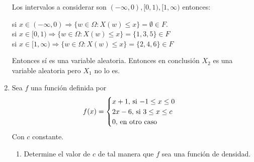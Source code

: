 \documentclass[12pt,a4paper]{report}
\begin{document}
\begin{enumerate}
{			Los intervalos a considerar son $(-\infty,0),[0,1),[1,\infty)$ entonces:\\
			\begin{center}
			    si $x\in (-\infty,0) \Rightarrow \lbrace w\in \Omega: X(w) \leq x \rbrace = \emptyset \in F. $\\
			    si $x\in [0,1) \Rightarrow \lbrace w \in \Omega: X(w) \leq x \rbrace = \lbrace 1,3,5 \rbrace \in F$  \\
			    si $x\in [1,\infty) \Rightarrow \lbrace w\in \Omega: X(w)\leq x \rbrace = \lbrace 2,4,6 \rbrace \in F$
			\end{center}
Entonces sí es una variable aleatoria. Entonces en conclusión $X_{2}$ es una variable aleatoria pero $X_{1}$ no lo es.\\
		}

		\item {
			Sea $f$ una función definida por
			\[
				f(x) = \begin{cases}
								x+1, $ si $ -1 \leq x \leq 0\\
								2x-6, $ si $ 3 \leq x \leq c\\
								0, $ en otro caso$
			\end{cases}
			\]
			Con $c$ constante.
			\begin{enumerate}
				\item{
					Determine el valor de $c$ de tal manera que $f$ sea una función de
					densidad.


}
\end{enumerate}}
\end{enumerate}
\end{document}
